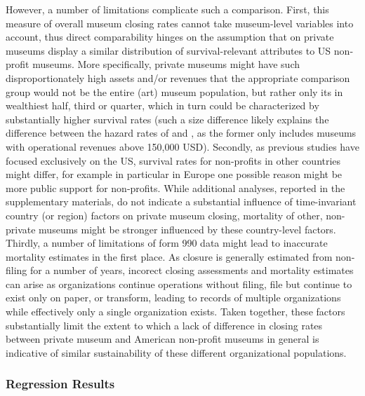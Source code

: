 \documentclass[12pt]{article}
\begin{document}
However, a number of limitations complicate such a comparison.
First, this measure of overall museum closing rates cannot take museum-level variables into account, thus direct comparability hinges on the assumption that on private museums display a similar distribution of survival-relevant attributes to US non-profit museums.
More specifically, private museums might have such disproportionately high assets and/or revenues that the appropriate comparison group would not be the entire (art) museum population, but rather only its in wealthiest half, third or quarter, which in turn could be characterized by substantially higher survival rates (such a size difference likely explains the difference between the hazard rates of \textcite{Gordon_etal_2013_insolvency} and \textcite{Bowen_etal_1994_charitable}, as the former only includes museums with operational revenues above 150,000 USD).
Secondly, as previous studies have focused exclusively on the US, survival rates for non-profits in other countries might differ, for example in particular in Europe one possible reason might be more public support for non-profits.
While additional analyses, reported in the supplementary materials, do not indicate a substantial influence of time-invariant country (or region) factors on private museum closing, mortality of other, non-private museums might be stronger influenced by these country-level factors.
Thirdly, a number of limitations of form 990 data might lead to inaccurate mortality estimates in the first place.
As closure is generally estimated from non-filing for a number of years, incorect closing assessments and mortality estimates can arise as organizations continue operations without filing, file but continue to exist only on paper, or transform, leading to records of multiple organizations while effectively only a single organization exists.
Taken together, these factors substantially limit the extent to which a lack of difference in closing rates between private museum and American non-profit museums in general is indicative of similar sustainability of these different organizational populations. 
\subsubsection*{Regression Results}
\end{document}
